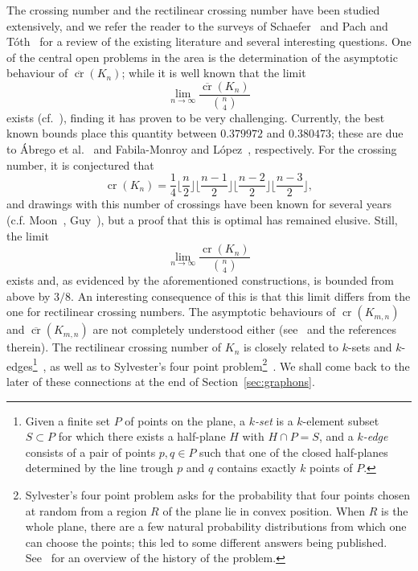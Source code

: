 \documentclass{article}
\begin{document}
The crossing number and the rectilinear crossing number have been studied extensively, and we refer the reader to the surveys of Schaefer~\cite{schaefersurvey} and Pach and Tóth~\cite{thirteenproblems} for a review of the existing literature and several interesting questions. One of the central open problems in the area is the determination of the asymptotic behaviour of $\overline{\mathop{\mathrm{cr}}}(K_n)$; while it is well known that the limit \[\lim_{n\rightarrow\infty}\frac{\overline{\mathop{\mathrm{cr}}}(K_n)}{\binom{n}{4}}\] exists (cf.~\cite{sylvester}), finding it has proven to be very challenging. Currently, the best known bounds place this quantity between $0.379972$ and $0.380473$; these are due to Ábrego et al.~\cite{recKnlower} and Fabila-Monroy and López~\cite{recKnupper}, respectively. For the crossing number, it is conjectured that \[\mathop{\mathrm{cr}}(K_n)=\frac{1}{4}\lfloor\frac{n}{2}\rfloor\lfloor\frac{n-1}{2}\rfloor\lfloor\frac{n-2}{2}\rfloor\lfloor\frac{n-3}{2}\rfloor,\] and drawings with this number of crossings have been known for several years (c.f. Moon~\cite{mooncrKn}, Guy~\cite{guycrKn}), but a proof that this is optimal has remained elusive. Still, the limit \[\lim_{n\rightarrow\infty}\frac{\mathop{\mathrm{cr}}(K_n)}{\binom{n}{4}}\] exists and, as evidenced by the aforementioned constructions, is bounded from above by $3/8$. An interesting consequence of this is that this limit differs from the one for rectilinear crossing numbers. The asymptotic behaviours of $\mathop{\mathrm{cr}}(K_{m,n})$ and $\overline{\mathop{\mathrm{cr}}}(K_{m,n})$ are not completely understood either (see~\cite{schaefersurvey} and the references therein). The rectilinear crossing number of $K_n$ is closely related to $k$-sets and $k$-edges\footnote{Given a finite set $P$ of points on the plane, a $k$\textit{-set} is a $k$-element subset $S\subset P$ for which there exists a half-plane $H$ with $H\cap P=S$, and a $k$\textit{-edge} consists of a pair of points $p,q\in P$ such that one of the closed half-planes determined by the line trough $p$ and $q$ contains exactly $k$ points of $P$.}~\cite{k-setslovasz,k-setsbalogh}, as well as to Sylvester's four point problem\footnote{Sylvester's four point problem asks for the probability that four points chosen at random from a region $R$ of the plane lie in convex position. When $R$ is the whole plane, there are a few natural probability distributions from which one can choose the points; this led to some different answers being published. See~\cite{historySylvester} for an overview of the history of the problem.}~\cite{sylvester}. We shall come back to the later of these connections at the end of Section~\ref{sec:graphons}.
\end{document}
